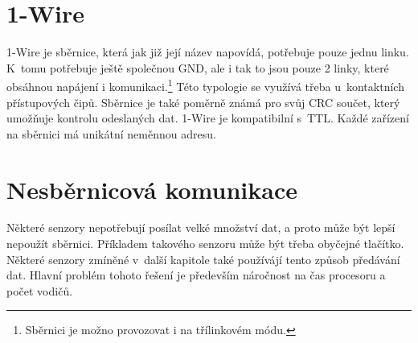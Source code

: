 \section{1-Wire}
1-Wire je sběrnice, která jak již její název napovídá, potřebuje pouze jednu linku.
K~tomu potřebuje ještě společnou GND, ale i tak to jsou pouze 2 linky, které obsáhnou napájení i komunikaci.\footnote{Sběrnici je možno provozovat i na třílinkovém módu.}
Této typologie se využívá třeba u~kontaktních přístupových čipů.
Sběrnice je také poměrně známá pro svůj CRC součet, který umožňuje kontrolu odeslaných dat.
1-Wire je kompatibilní s~TTL.
Každé zařízení na sběrnici má unikátní neměnnou adresu.
\cite{one-wire}

\section{Nesběrnicová komunikace}
Některé senzory nepotřebují posílat velké množství dat, a proto může být lepší nepoužít sběrnici. 
Příkladem takového senzoru může být třeba obyčejné tlačítko.
Některé senzory zmíněné v~další kapitole také používájí tento způsob předávání dat.
Hlavní problém tohoto řešení je především náročnost na čas procesoru a počet vodičů.

